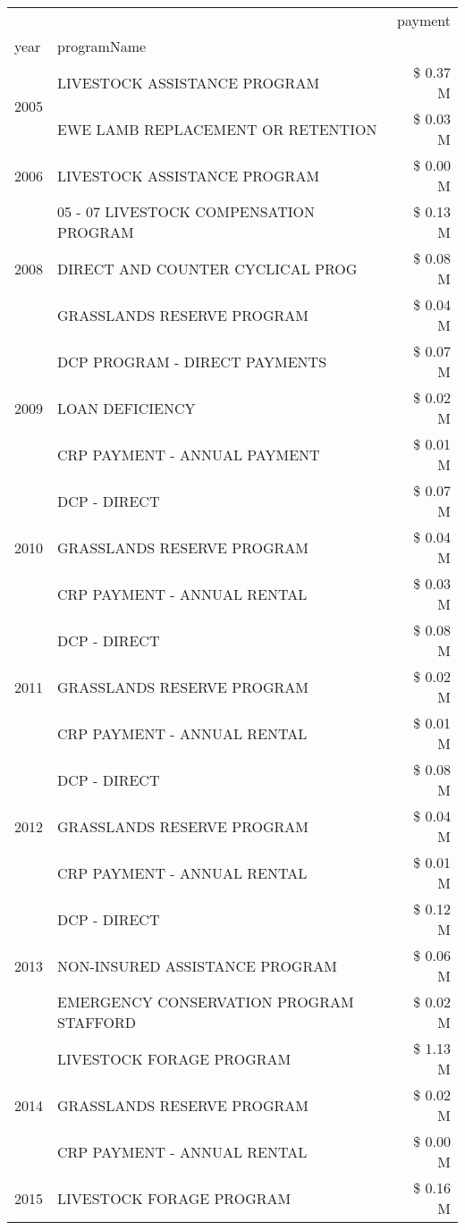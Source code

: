 \begin{tabular}{llr}
\toprule
 &  & payment \\
year & programName &  \\
\midrule
\multirow[t]{2}{*}{2005} & LIVESTOCK ASSISTANCE PROGRAM & \$ 0.37 M \\
 & EWE LAMB REPLACEMENT OR RETENTION & \$ 0.03 M \\
\cline{1-3}
2006 & LIVESTOCK ASSISTANCE PROGRAM & \$ 0.00 M \\
\cline{1-3}
\multirow[t]{3}{*}{2008} & 05 - 07 LIVESTOCK COMPENSATION PROGRAM & \$ 0.13 M \\
 & DIRECT AND COUNTER CYCLICAL PROG & \$ 0.08 M \\
 & GRASSLANDS RESERVE PROGRAM & \$ 0.04 M \\
\cline{1-3}
\multirow[t]{3}{*}{2009} & DCP PROGRAM - DIRECT PAYMENTS & \$ 0.07 M \\
 & LOAN DEFICIENCY & \$ 0.02 M \\
 & CRP PAYMENT - ANNUAL PAYMENT & \$ 0.01 M \\
\cline{1-3}
\multirow[t]{3}{*}{2010} & DCP - DIRECT & \$ 0.07 M \\
 & GRASSLANDS RESERVE PROGRAM & \$ 0.04 M \\
 & CRP PAYMENT - ANNUAL RENTAL & \$ 0.03 M \\
\cline{1-3}
\multirow[t]{3}{*}{2011} & DCP - DIRECT & \$ 0.08 M \\
 & GRASSLANDS RESERVE PROGRAM & \$ 0.02 M \\
 & CRP PAYMENT - ANNUAL RENTAL & \$ 0.01 M \\
\cline{1-3}
\multirow[t]{3}{*}{2012} & DCP - DIRECT & \$ 0.08 M \\
 & GRASSLANDS RESERVE PROGRAM & \$ 0.04 M \\
 & CRP PAYMENT - ANNUAL RENTAL & \$ 0.01 M \\
\cline{1-3}
\multirow[t]{3}{*}{2013} & DCP - DIRECT & \$ 0.12 M \\
 & NON-INSURED ASSISTANCE PROGRAM & \$ 0.06 M \\
 & EMERGENCY CONSERVATION PROGRAM STAFFORD & \$ 0.02 M \\
\cline{1-3}
\multirow[t]{3}{*}{2014} & LIVESTOCK FORAGE PROGRAM & \$ 1.13 M \\
 & GRASSLANDS RESERVE PROGRAM & \$ 0.02 M \\
 & CRP PAYMENT - ANNUAL RENTAL & \$ 0.00 M \\
\cline{1-3}
\multirow[t]{2}{*}{2015} & LIVESTOCK FORAGE PROGRAM & \$ 0.16 M \\

\end{tabular}
